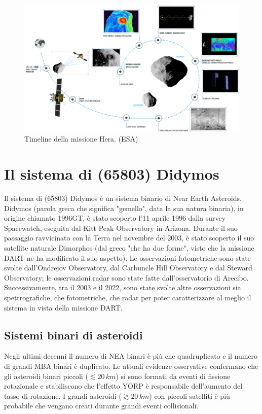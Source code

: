 \documentclass[a4paper,11pt,openright]{book}
\begin{document}
\begin{figure}[!h]
    \centering
    \includegraphics[scale=0.57]{figure/Hera_mission_timeline.png}
    \caption[Timeline della missione Hera.]{Timeline della missione Hera. (ESA)}
    \label{fig:hera_timeline}
\end{figure}

\chapter{Il sistema di (65803) Didymos}\label{ch:ch_4}
Il sistema di (65803) Didymos è un sistema binario di Near Earth Asteroids.\\
Didymos (parola greca che significa "gemello", data la sua natura binaria), in origine chiamato 1996GT, è stato scoperto l'11 aprile 1996 dalla survey Spacewatch, eseguita dal Kitt Peak Observatory in Arizona. Durante il suo passaggio ravvicinato con la Terra nel novembre del 2003, è stato scoperto il suo satellite naturale Dimorphos (dal greco "che ha due forme", visto che la missione DART ne ha modificato il suo aspetto). Le osservazioni fotometriche sono state svolte dall'Ondrejov Observatory, dal Carbuncle Hill Observatory e dal Steward Observatory; le osservazioni radar sono state fatte dall'osservatorio di Arecibo.\\
Successivamente, tra il 2003 e il 2022, sono state svolte altre osservazioni sia spettrografiche, che fotometriche, che radar per poter caratterizzare al meglio il sistema in vista della missione DART.

\section{Sistemi binari di asteroidi}\label{sec:binary_system}
Negli ultimi decenni il numero di NEA binari è più che quadruplicato e il numero di grandi MBA binari è duplicato. Le attuali evidenze osservative confermano che gli asteroidi binari piccoli ($\lesssim 20\,km$) si sono formati da eventi di fissione rotazionale e stabiliscono che l'effetto YORP è responsabile dell'aumento del tasso di rotazione. I grandi asteroidi ($\gtrsim20\,km$) con piccoli satelliti è più probabile che vengano creati durante grandi eventi collisionali.
\end{document}
